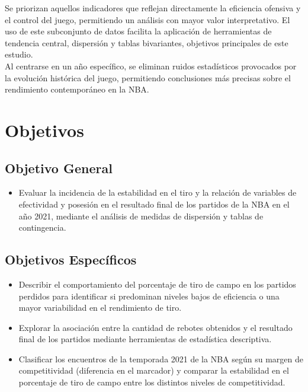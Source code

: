 \documentclass[oneside,11pt]{Latex/Classes/PhDthesisPSnPDF}
\begin{document}
Se priorizan aquellos indicadores que reflejan directamente la
eficiencia ofensiva y el control del juego, permitiendo un análisis con
mayor valor interpretativo. El uso de este subconjunto de datos facilita
la aplicación de herramientas de tendencia central, dispersión y tablas
bivariantes, objetivos principales de este estudio.\\

Al centrarse en un año específico, se eliminan ruidos estadísticos
provocados por la evolución histórica del juego, permitiendo
conclusiones más precisas sobre el rendimiento contemporáneo en la
NBA.\\

\section{Objetivos}

\subsection{Objetivo General}
\begin{itemize}
  \item{Evaluar la incidencia de la estabilidad en el tiro y la relación de variables de efectividad y posesión en el resultado final de los partidos de la NBA en el año 2021, mediante el análisis de medidas de dispersión y tablas de contingencia.}
\end{itemize}

\subsection{Objetivos Específicos}
\begin{itemize}
  \item{Describir el comportamiento del porcentaje de tiro de campo en los partidos perdidos para identificar si predominan niveles bajos de eficiencia o una mayor variabilidad en el rendimiento de tiro.}
  \item{Explorar la asociación entre la cantidad de rebotes obtenidos y el resultado final de los partidos mediante herramientas de estadística descriptiva.}
  \item{Clasificar los encuentros de la temporada 2021 de la NBA según su margen de competitividad (diferencia en el marcador) y comparar la estabilidad en el porcentaje de tiro de campo entre los distintos niveles de competitividad.}
\end{itemize}
\end{document}
